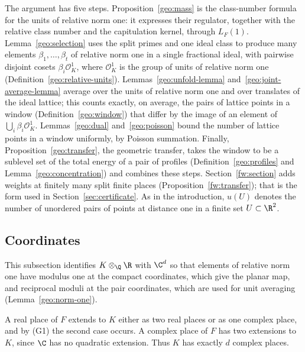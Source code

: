 The argument has five steps. Proposition~\ref{geo:mass} is the
class-number formula for the units of relative norm one: it expresses
their regulator, together with the relative class number and the
capitulation kernel, through $L_F(1)$. Lemma~\ref{geo:selection} uses the
split primes and one ideal class to produce many elements
$\beta_1,\dots,\beta_t$ of relative norm one in a single fractional ideal,
with pairwise disjoint cosets $\beta_i\mathcal O_K^1$, where $\mathcal O_K^1$ is
the group of units of relative norm one (Definition~\ref{geo:relative-units}).
Lemmas~\ref{geo:unfold-lemma} and~\ref{geo:joint-average-lemma} average
over the units of relative norm one and over translates of the ideal
lattice; this counts exactly, on average, the pairs of lattice points in a
window (Definition~\ref{geo:window}) that differ by the image of an element
of $\bigcup_i\beta_i\mathcal O_K^1$. Lemmas~\ref{geo:dual}
and~\ref{geo:poisson} bound the number of lattice points in a window
uniformly, by Poisson summation. Finally, Proposition~\ref{geo:transfer},
the geometric transfer, takes the window to be a sublevel set of the total
energy of a pair of profiles (Definition~\ref{geo:profiles} and
Lemma~\ref{geo:concentration}) and combines these steps.
Section~\ref{fw:section} adds weights at finitely many split finite places
(Proposition~\ref{fw:transfer}); that is the form used in
Section~\ref{sec:certificate}. As in the introduction, $u(U)$ denotes the
number of unordered pairs of points at distance one in a finite set
$U\subset\R^2$.

\subsection{Coordinates}
This subsection identifies $K\otimes_\Q\R$ with $\C^d$ so that elements of
relative norm one have modulus one at the compact coordinates, which give the
planar map, and reciprocal moduli at the pair coordinates, which are used for
unit averaging (Lemma~\ref{geo:norm-one}).

A real place of $F$ extends to $K$ either as two real places or as one
complex place, and by (G1) the second case occurs. A complex place of
$F$ has two extensions to $K$, since $\C$ has no quadratic extension.
Thus $K$ has exactly $d$ complex places.

